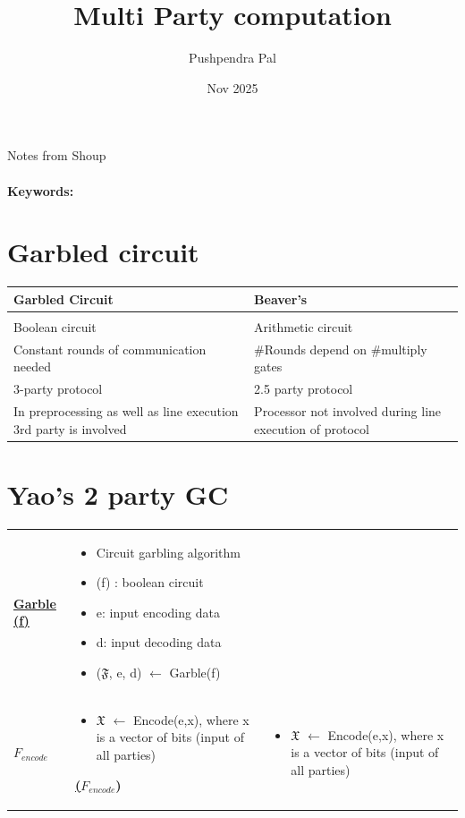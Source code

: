 \documentclass{article}
\title{Multi Party computation}
\author{Pushpendra Pal}
\date{Nov 2025}
\begin{document}
\maketitle Notes from Shoup
\\\\
\textbf{Keywords:} 
\section{Garbled circuit}
\begin{tabular}{l l@{}}
  Garbled Circuit & Beaver's \\
\hline \\
  Boolean circuit  & Arithmetic circuit \\
  Constant rounds of communication needed & \#Rounds depend on \#multiply gates \\
  3-party protocol & 2.5 party protocol \\
  In preprocessing as well as line \newline execution 3rd party is involved & Processor not \newline involved during line execution of protocol \\

\end{tabular}

\section{Yao's 2 party GC}
\begin{tabularx}{1\linewidth}{p{2cm} X}
\textbf{\underline{Garble (f)}} & \begin{itemize}  \item Circuit garbling algorithm
  \item (f) : boolean circuit
  \item e: input encoding data
  \item d: input decoding data
  \item ($\mathfrak{F}$, e, d) $\xleftarrow{}$ Garble(f)
\end{itemize} \\
\underline{\textbf{$F_{encode}$}} & 
\begin{itemize}
  \item $\mathfrak{X}$ $\xleftarrow{}$ Encode(e,x), where x is a vector of bits (input of all parties)
\end{itemize}
\textbf{\underline($F_{encode}$)} & 
\begin{itemize}
  \item $\mathfrak{X}$ $\xleftarrow{}$ Encode(e,x), where x is a vector of bits (input of all parties)
\end{itemize}
\end{tabularx}
\end{document}
